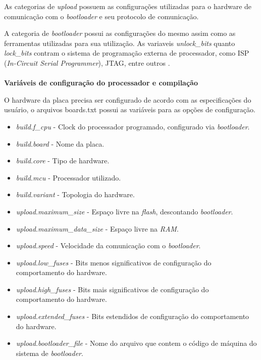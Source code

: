 As categorias de \textit{upload} possuem as configurações utilizadas para o hardware de comunicação com o \textit{bootloader} e seu protocolo de comunicação.

A categoria de \textit{bootloader} possui as configurações do mesmo assim como as ferramentas utilizadas para sua utilização. As variaveis \textit{unlock\_bits} quanto \textit{lock\_bits} contram o sistema de programação externa de processador, como ISP (\textit{In-Circuit Serial Programmer}), JTAG, entre outros \cite{fuseSettings}. 
\\
\\
\textbf{Variáveis de configuração do processador e compilação}

O hardware da placa precisa ser configurado de acordo com as especificações do usuário, o arquivos boards.txt possui as variáveis para as opções de configuração.

\begin{itemize}

\item \textit{build.f\_cpu} - Clock do processador programado, configurado via \textit{bootloader}.

\item \textit{build.board} - Nome da placa.

\item \textit{build.core} - Tipo de hardware.

\item \textit{build.mcu} - Processador utilizado\cite{ATmega48A}.

\item \textit{build.variant} - Topologia do hardware.

\item \textit{upload.maximum\_size} - Espaço livre na \textit{flash}, descontando \textit{bootloader}.

\item \textit{upload.maximum\_data\_size} - Espaço livre na \textit{RAM}.

\item \textit{upload.speed} - Velocidade da comunicação com o \textit{bootloader}.

\item \textit{upload.low\_fuses} - Bits menos significativos de configuração do comportamento do hardware.

\item \textit{upload.high\_fuses} - Bits mais significativos de configuração do comportamento do hardware.

\item \textit{upload.extended\_fuses} - Bits estendidos de configuração do comportamento do hardware.

\item \textit{upload.bootloader\_file} - Nome do arquivo que contem o código de máquina do sistema de \textit{bootloader}.

\end{itemize}

